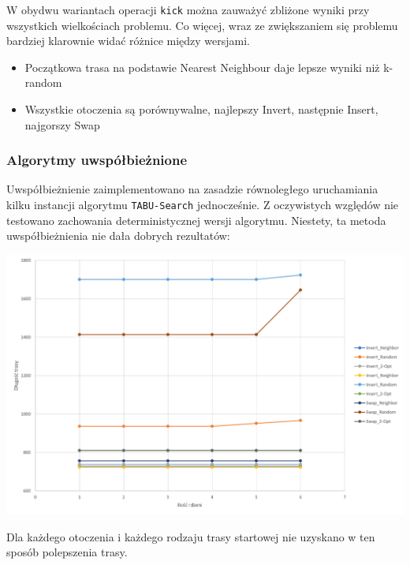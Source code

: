 \documentclass{article}
\begin{document}
W obydwu wariantach operacji \texttt{kick} można zauważyć zbliżone wyniki przy wszystkich wielkościach problemu. Co więcej, wraz ze zwiększaniem się problemu bardziej klarownie widać różnice między wersjami. 
\begin{itemize}
	\item Początkowa trasa na podstawie Nearest Neighbour daje lepsze wyniki niż k-random
	\item Wszystkie otoczenia są porównywalne, najlepszy Invert, następnie Insert, najgorszy Swap
\end{itemize}

\newpage
\subsubsection{Algorytmy uwspółbieżnione}

Uwspółbieżnienie zaimplementowano na zasadzie równoległego uruchamiania kilku instancji algorytmu \texttt{TABU-Search} jednocześnie. Z oczywistych względów nie testowano zachowania deterministycznej wersji algorytmu. Niestety, ta metoda uwspółbieżnienia nie dała dobrych rezultatów:

\includegraphics[scale=0.4]{parallel_n=70}

Dla każdego otoczenia i każdego rodzaju trasy startowej nie uzyskano w ten sposób polepszenia trasy.
\end{document}
